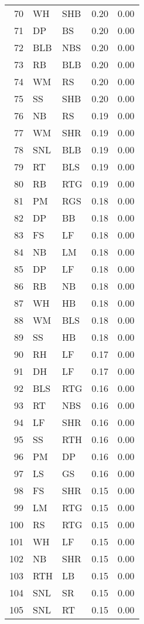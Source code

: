 \begin{table}[ht]
\begin{tabular}{rllrr}
  70 & WH & SHB & 0.20 & 0.00 \\ 
  71 & DP & BS & 0.20 & 0.00 \\ 
  72 & BLB & NBS & 0.20 & 0.00 \\ 
  73 & RB & BLB & 0.20 & 0.00 \\ 
  74 & WM & RS & 0.20 & 0.00 \\ 
  75 & SS & SHB & 0.20 & 0.00 \\ 
  76 & NB & RS & 0.19 & 0.00 \\ 
  77 & WM & SHR & 0.19 & 0.00 \\ 
  78 & SNL & BLB & 0.19 & 0.00 \\ 
  79 & RT & BLS & 0.19 & 0.00 \\ 
  80 & RB & RTG & 0.19 & 0.00 \\ 
  81 & PM & RGS & 0.18 & 0.00 \\ 
  82 & DP & BB & 0.18 & 0.00 \\ 
  83 & FS & LF & 0.18 & 0.00 \\ 
  84 & NB & LM & 0.18 & 0.00 \\ 
  85 & DP & LF & 0.18 & 0.00 \\ 
  86 & RB & NB & 0.18 & 0.00 \\ 
  87 & WH & HB & 0.18 & 0.00 \\ 
  88 & WM & BLS & 0.18 & 0.00 \\ 
  89 & SS & HB & 0.18 & 0.00 \\ 
  90 & RH & LF & 0.17 & 0.00 \\ 
  91 & DH & LF & 0.17 & 0.00 \\ 
  92 & BLS & RTG & 0.16 & 0.00 \\ 
  93 & RT & NBS & 0.16 & 0.00 \\ 
  94 & LF & SHR & 0.16 & 0.00 \\ 
  95 & SS & RTH & 0.16 & 0.00 \\ 
  96 & PM & DP & 0.16 & 0.00 \\ 
  97 & LS & GS & 0.16 & 0.00 \\ 
  98 & FS & SHR & 0.15 & 0.00 \\ 
  99 & LM & RTG & 0.15 & 0.00 \\ 
  100 & RS & RTG & 0.15 & 0.00 \\ 
  101 & WH & LF & 0.15 & 0.00 \\ 
  102 & NB & SHR & 0.15 & 0.00 \\ 
  103 & RTH & LB & 0.15 & 0.00 \\ 
  104 & SNL & SR & 0.15 & 0.00 \\ 
  105 & SNL & RT & 0.15 & 0.00 \\ 

\end{tabular}
\end{table}
